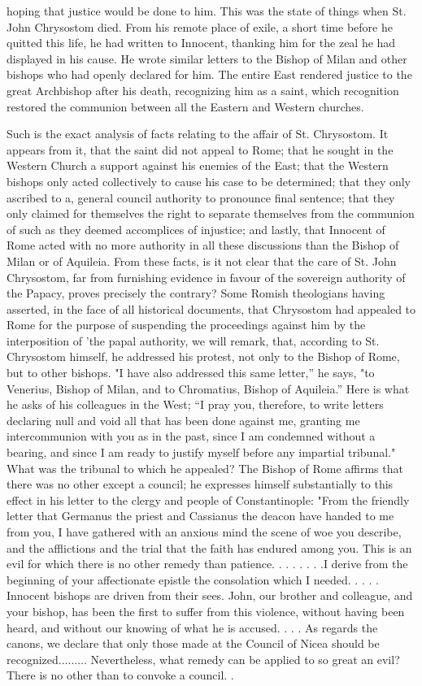 hoping that justice would be done to him. This was the state of things when St. John Chrysostom died. From his remote place of exile, a short time before he quitted this life, he had written to Innocent, thanking him for the zeal he had displayed in his cause. He wrote similar letters to the Bishop of Milan and other bishops who had openly declared for him. The entire East rendered justice to the great Archbishop after his death, recognizing him as a saint, which recognition restored the communion between all the Eastern and Western churches.

Such is the exact analysis of facts relating to the affair of St. Chrysostom. It appears from it, that the saint did not appeal to Rome; that he sought in the Western Church a support against his enemies of the East; that the Western bishops only acted collectively to cause his case to be determined; that they only ascribed to a, general council authority to pronounce final sentence; that they only claimed for themselves the right to separate themselves from the communion of such as they deemed accomplices of injustice; and lastly, that Innocent of Rome acted with no more authority in all these discussions than the Bishop of Milan or of Aquileia. From these facts, is it not clear that the care of St. John Chrysostom, far from furnishing evidence in favour of the sovereign authority of the Papacy, proves precisely the contrary? Some Romish theologians having asserted, in the face of all historical documents, that Chrysostom had appealed to Rome for the purpose of suspending the proceedings against him by the interposition of 'the papal authority, we will remark, that, according to St. Chrysostom himself, he addressed his protest, not only to the Bishop of Rome, but to other bishops. "I have also addressed this same letter,” he says, "to Venerius, Bishop of Milan, and to Chromatius, Bishop of Aquileia.” Here is what he asks of his colleagues in the West; “I pray you, therefore, to write letters declaring null and void all that has been done against me, granting me intercommunion with you as in the past, since I am condemned without a bearing, and since I am ready to justify myself before any impartial tribunal." What was the tribunal to which he appealed? The Bishop of Rome affirms that there was no other except a council; he expresses himself substantially to this effect in his letter to the clergy and people of Constantinople: "From the friendly letter that Germanus the priest and Cassianus the deacon have handed to me from you, I have gathered with an anxious mind the scene of woe you describe, and the afflictions and the trial that the faith has endured among you. This is an evil for which there is no other remedy than patience. . . . . . . .I derive from the beginning of your affectionate epistle the consolation which I needed. . . . . Innocent bishops are driven from their sees. John, our brother and colleague, and your bishop, has been the first to suffer from this violence, without having been heard, and without our knowing of what he is accused. . . . As regards the canons, we declare that only those made at the Council of Nicea should be recognized......... Nevertheless, what remedy can be applied to so great an evil? There is no other than to convoke a council. . 